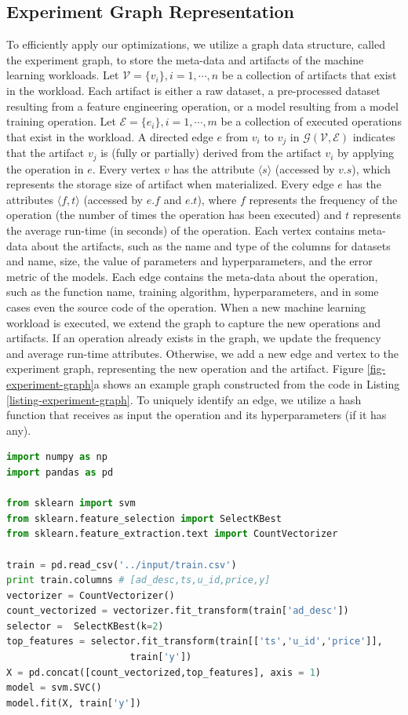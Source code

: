 \subsection{Experiment Graph Representation}\label{sub-graph-construction}
To efficiently apply our optimizations, we utilize a graph data structure, called the experiment graph, to store the meta-data and artifacts of the machine learning workloads.
Let $\mathcal{V}=\{v_i\}, i = 1, \cdots, n$ be a collection of artifacts that exist in the workload.
Each artifact is either a raw dataset, a pre-processed dataset resulting from a feature engineering operation, or a model resulting from a model training operation.
Let $\mathcal{E}=\{e_i\}, i = 1, \cdots, m$ be a collection of executed operations that exist in the workload.
A directed edge $e$ from $v_i$ to $v_j$ in $\mathcal{G}(\mathcal{V},\mathcal{E})$ indicates that the artifact $v_j$ is (fully or partially) derived from the artifact $v_i$ by applying the operation in $e$.
Every vertex $v$ has the attribute $\langle s \rangle$ (accessed by $v.s$), which represents the storage size of artifact when materialized.
Every edge $e$ has the attributes $\langle f, t\rangle$ (accessed by $e.f$ and $e.t$), where $f$ represents the frequency of the operation (the number of times the operation has been executed) and $t$ represents the average run-time (in seconds) of the operation.
Each vertex contains meta-data about the artifacts, such as the name and type of the columns for datasets and name, size, the value of parameters and hyperparameters, and the error metric of the models.
Each edge contains the meta-data about the operation, such as the function name, training algorithm, hyperparameters, and in some cases even the source code of the operation.
When a new machine learning workload is executed, we extend the graph to capture the new operations and artifacts.
If an operation already exists in the graph, we update the frequency and average run-time attributes.
Otherwise, we add a new edge and vertex to the experiment graph, representing the new operation and the artifact.
Figure \ref{fig-experiment-graph}a shows an example graph constructed from the code in Listing \ref{listing-experiment-graph}.
To uniquely identify an edge, we utilize a hash function that receives as input the operation and its hyperparameters (if it has any).

\begin{lstlisting}[language=Python, caption=Example script,captionpos=b,label = {listing-experiment-graph}]
import numpy as np
import pandas as pd

from sklearn import svm
from sklearn.feature_selection import SelectKBest
from sklearn.feature_extraction.text import CountVectorizer

train = pd.read_csv('../input/train.csv') 
print train.columns # [ad_desc,ts,u_id,price,y]
vectorizer = CountVectorizer()
count_vectorized = vectorizer.fit_transform(train['ad_desc'])
selector =  SelectKBest(k=2)
top_features = selector.fit_transform(train[['ts','u_id','price']], 
				      train['y'])
X = pd.concat([count_vectorized,top_features], axis = 1)
model = svm.SVC()
model.fit(X, train['y'])
\end{lstlisting}

